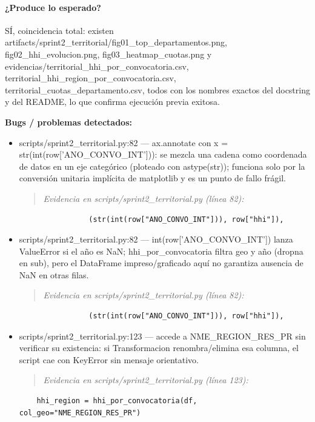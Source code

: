 \paragraph{¿Produce lo esperado?}
SÍ, coincidencia total: existen artifacts/sprint2\_territorial/fig01\_top\_departamentos.png, fig02\_hhi\_evolucion.png, fig03\_heatmap\_cuotas.png y evidencias/territorial\_hhi\_por\_convocatoria.csv, territorial\_hhi\_region\_por\_convocatoria.csv, territorial\_cuotas\_departamento.csv, todos con los nombres exactos del docstring y del README, lo que confirma ejecución previa exitosa.

\begin{tcolorbox}[riesgo]
\textbf{Bugs / problemas detectados:}
\begin{itemize}
  \item scripts/sprint2\_territorial.py:82 --- ax.annotate con x = str(int(row['ANO\_CONVO\_INT'])): se mezcla una cadena como coordenada de datos en un eje categórico (ploteado con astype(str)); funciona solo por la conversión unitaria implícita de matplotlib y es un punto de fallo frágil.
\begin{quote}\footnotesize\ttfamily
\noindent\emph{Evidencia en scripts/sprint2\_territorial.py (línea 82):}
\end{quote}
\begin{lstlisting}
                (str(int(row["ANO_CONVO_INT"])), row["hhi"]),
\end{lstlisting}

  \item scripts/sprint2\_territorial.py:82 --- int(row['ANO\_CONVO\_INT']) lanza ValueError si el año es NaN; hhi\_por\_convocatoria filtra geo y año (dropna en sub), pero el DataFrame impreso/graficado aquí no garantiza ausencia de NaN en otras filas.
\begin{quote}\footnotesize\ttfamily
\noindent\emph{Evidencia en scripts/sprint2\_territorial.py (línea 82):}
\end{quote}
\begin{lstlisting}
                (str(int(row["ANO_CONVO_INT"])), row["hhi"]),
\end{lstlisting}

  \item scripts/sprint2\_territorial.py:123 --- accede a NME\_REGION\_RES\_PR sin verificar su existencia: si Transformacion renombra/elimina esa columna, el script cae con KeyError sin mensaje orientativo.
\begin{quote}\footnotesize\ttfamily
\noindent\emph{Evidencia en scripts/sprint2\_territorial.py (línea 123):}
\end{quote}
\begin{lstlisting}
    hhi_region = hhi_por_convocatoria(df, col_geo="NME_REGION_RES_PR")
\end{lstlisting}

\end{itemize}
\end{tcolorbox}

